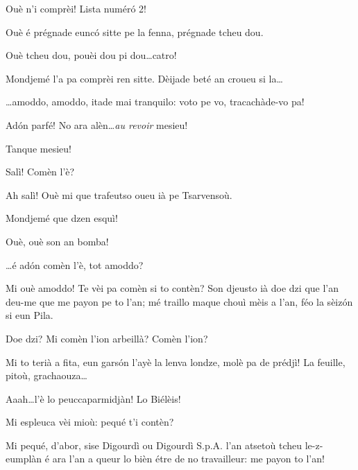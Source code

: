 \begin{drama}
\Pompiolenspeaks {} Ouè n'i comprèi! Lista num\'er\'o 2!


\Cimaspeaks Ouè é prégnade eunc\'o sitte pe la fenna, prégnade tcheu dou.

\Pompiolenspeaks{} Ouè tcheu dou, pouèi dou pi dou\ldots catro!

\Cimaspeaks {} Mondjemé l'a pa comprèi ren sitte.  Dèijade beté an croueu si la\ldots

\Pompiolenspeaks \ldots amoddo, amoddo, itade mai tranquilo: voto pe vo, tra\-ca\-chà\-de-vo pa!

\Marcospeaks Ad\'on parfé! No ara alèn\ldots \textit{au revoir} mesieu!

\Cimaspeaks Tanque mesieu!






\Cimaspeaks{} Salì! Comèn l'è?

\Jeanspeaks Ah salì! Ouè mi que trafeutso oueu ià pe Tsarvensoù.

\Cimaspeaks Mondjemé que dzen esquì!

\Jeanspeaks Ouè, ouè son an bomba!

\Cimaspeaks \ldots é ad\'on comèn l'è, tot amoddo?

\Jeanspeaks Mi ouè amoddo! Te vèi pa comèn si to contèn? Son djeusto ià doe dzi que l'an deu-me que me payon pe to l'an; mé traillo maque chouì mèis a l'an, féo la sèiz\'on si eun Pila.

\Cimaspeaks {} Doe dzi? Mi comèn l'ion arbeillà? Comèn l'ion?

\Jeanspeaks Mi to terià a fita, eun gars\'on l'ayè la lenva londze, molè pa de prédjì! La feuille, pitoù, grachaouza\ldots

\Cimaspeaks {} Aaah\ldots l'è lo peuccaparmidjàn! Lo Biélèis!

\Marcospeaks Mi espleuca vèi mioù: pequé t'i contèn?

\Jeanspeaks Mi pequé, d'abor, sise Digourdì ou Digourdì S.p.A. l’an atsetoù tcheu le-z-eumplàn é ara l'an a queur lo bièn étre de no travailleur: me payon to l'an!


\end{drama}
